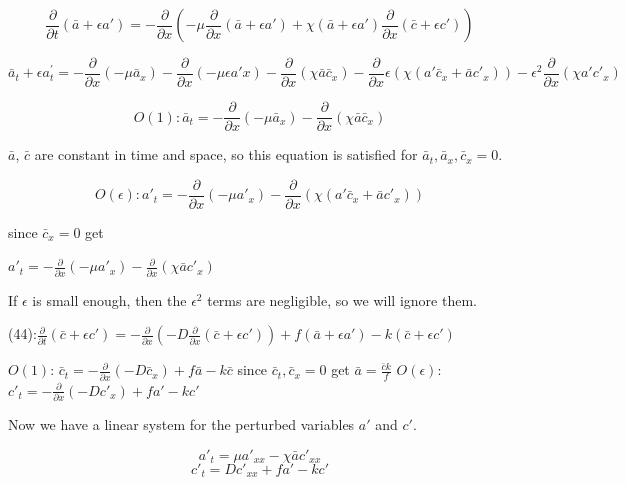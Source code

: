 \documentclass[]{article}
\numberwithin{equation}{section}		%
\begin{document}
\begin{equation}
	\frac{\partial}{\partial t}(\bar{a}+\epsilon a')=-\frac{\partial}{\partial x}(-\mu\frac{\partial}{\partial x}(\bar{a}+\epsilon a')+\chi(\bar{a}+\epsilon a')\frac{\partial}{\partial x}(\bar{c}+\epsilon c'))
\end{equation}

{\footnotesize
\begin{equation}
\bar{a}_t+\epsilon a^{'}_{t}=-\frac{\partial}{\partial x}(-\mu\bar{a}_x)-\frac{\partial}{\partial x}(-\mu\epsilon a'x)-\frac{\partial}{\partial x}(\chi\bar{a}\bar{c}_x)-\frac{\partial}{\partial x}\epsilon(\chi(a'\bar{c}_x+\bar{a}c'_x))-\epsilon^2\frac{\partial}{\partial x}(\chi a'c'_x)
\end{equation}
}

\begin{equation}
	O(1): \bar{a}_t=-\frac{\partial}{\partial x}(-\mu\bar{a}_x)-\frac{\partial}{\partial x}(\chi\bar{a}\bar{c}_x)
\end{equation}

$\bar{a}$, $\bar{c}$ are constant in time and space, so this equation is satisfied for $\bar{a}_t,\bar{a}_x,\bar{c}_x=0$.

\begin{equation}
	O(\epsilon): a'_t=-\frac{\partial}{\partial x}(-\mu a'_x)-\frac{\partial}{\partial x}(\chi(a'\bar{c}_x+\bar{a}c'_x))
\end{equation}



\indent since $\bar{c}_x =0$ get


\indent $a'_t=-\frac{\partial}{\partial x}(-\mu a'_x)-\frac{\partial}{\partial x}(\chi\bar{a}c'_x)$


\indent If $\epsilon$ is small enough, then the $\epsilon^2$ terms are negligible, so we will ignore them.


\indent(44):$\frac{\partial}{\partial t}(\bar{c}+\epsilon c')=-\frac{\partial}{\partial x}(-D\frac{\partial}{\partial x}(\bar{c}+\epsilon c'))+f(\bar{a}+\epsilon a')-k(\bar{c}+\epsilon c')$

\indent$O(1)$: $\bar{c}_t=-\frac{\partial}{\partial x}(-D\bar{c}_x)+f\bar{a}-k\bar{c}$
\indent since $\bar{c}_t, \bar{c}_x =0$ get
\indent $\bar{a}=\frac{\bar{c}k}{f}$
\indent$O(\epsilon)$: $c'_t=-\frac{\partial}{\partial x}(-D c'_x)+fa'-kc'$

Now we have a linear system for the perturbed variables $a'$ and $c'$.

\begin{equation}
a'_t=\mu a'_{xx}-\chi\bar{a}c'_{xx}
\end{equation}
\begin{equation}
c'_t=Dc'_{xx}+fa'-kc'
\end{equation}\
\end{document}
